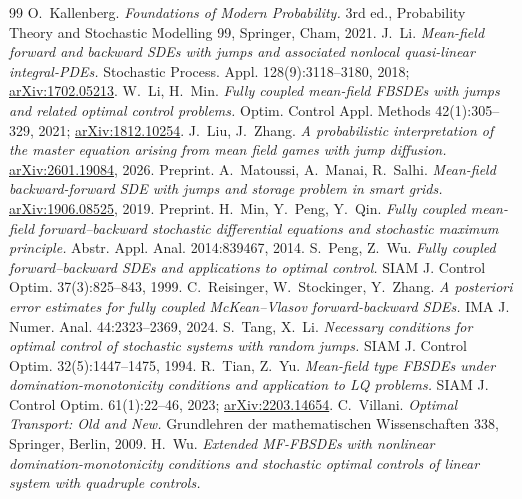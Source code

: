 \begin{thebibliography}{99}
 O.~Kallenberg.
  \emph{Foundations of Modern Probability.} 3rd ed., Probability Theory and Stochastic
  Modelling 99, Springer, Cham, 2021.
 J.~Li.
  \emph{Mean-field forward and backward SDEs with jumps and associated nonlocal
  quasi-linear integral-PDEs.} Stochastic Process. Appl. 128(9):3118--3180, 2018;
  \href{https://arxiv.org/abs/1702.05213}{arXiv:1702.05213}.
 W.~Li, H.~Min.
  \emph{Fully coupled mean-field FBSDEs with jumps and related optimal control
  problems.} Optim. Control Appl. Methods 42(1):305--329, 2021;
  \href{https://arxiv.org/abs/1812.10254}{arXiv:1812.10254}.
 J.~Liu, J.~Zhang.
  \emph{A probabilistic interpretation of the master equation arising from mean field
  games with jump diffusion.} \href{https://arxiv.org/abs/2601.19084}{arXiv:2601.19084},
  2026. Preprint.
 A.~Matoussi, A.~Manai, R.~Salhi.
  \emph{Mean-field backward-forward SDE with jumps and storage problem in smart grids.}
  \href{https://arxiv.org/abs/1906.08525}{arXiv:1906.08525}, 2019. Preprint.
 H.~Min, Y.~Peng, Y.~Qin.
  \emph{Fully coupled mean-field forward--backward stochastic differential equations
  and stochastic maximum principle.} Abstr. Appl. Anal. 2014:839467, 2014.
 S.~Peng, Z.~Wu.
  \emph{Fully coupled forward--backward SDEs and applications to optimal control.}
  SIAM J. Control Optim. 37(3):825--843, 1999.
 C.~Reisinger, W.~Stockinger, Y.~Zhang.
  \emph{A posteriori error estimates for fully coupled McKean--Vlasov forward-backward
  SDEs.} IMA J. Numer. Anal. 44:2323--2369, 2024.
 S.~Tang, X.~Li.
  \emph{Necessary conditions for optimal control of stochastic systems with random
  jumps.} SIAM J. Control Optim. 32(5):1447--1475, 1994.
 R.~Tian, Z.~Yu.
  \emph{Mean-field type FBSDEs under domination-monotonicity conditions and
  application to LQ problems.} SIAM J. Control Optim. 61(1):22--46, 2023;
  \href{https://arxiv.org/abs/2203.14654}{arXiv:2203.14654}.
 C.~Villani.
  \emph{Optimal Transport: Old and New.} Grundlehren der mathematischen
  Wissenschaften 338, Springer, Berlin, 2009.
 H.~Wu.
  \emph{Extended MF-FBSDEs with nonlinear domination-monotonicity conditions and stochastic
  optimal controls of linear system with quadruple controls.}

\end{thebibliography}
